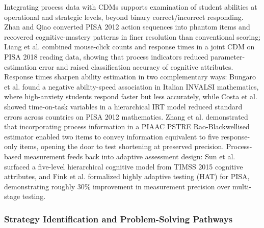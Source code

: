 \documentclass{ieeeaccess}
\begin{document}
Integrating process data with CDMs supports examination of student abilities at operational and strategic levels, beyond binary correct/incorrect responding. Zhan and Qiao \cite{zhan-qiao2022} converted PISA 2012 action sequences into phantom items and recovered cognitive-mastery patterns in finer resolution than conventional scoring; Liang et al. \cite{liang-etal2023} combined mouse-click counts and response times in a joint CDM on PISA 2018 reading data, showing that process indicators reduced parameter-estimation error and raised classification accuracy of cognitive attributes. Response times sharpen ability estimation in two complementary ways: Bungaro et al. \cite{bungaro-etal2024} found a negative ability-speed association in Italian INVALSI mathematics, where high-anxiety students respond faster but less accurately, while Costa et al. \cite{costa-etal2021} showed time-on-task variables in a hierarchical IRT model reduced standard errors across countries on PISA 2012 mathematics. Zhang et al. \cite{zhang-etal2023} demonstrated that incorporating process information in a PIAAC PSTRE Rao-Blackwellised estimator enabled two items to convey information equivalent to five response-only items, opening the door to test shortening at preserved precision. Process-based measurement feeds back into adaptive assessment design: Sun et al. \cite{sun-etal2023} surfaced a five-level hierarchical cognitive model from TIMSS 2015 cognitive attributes, and Fink et al. \cite{fink-etal2024} formalized highly adaptive testing (HAT) for PISA, demonstrating roughly 30\% improvement in measurement precision over multi-stage testing.

\subsubsection{Strategy Identification and Problem-Solving Pathways}\label{subsubsec4.2.2}
\end{document}
